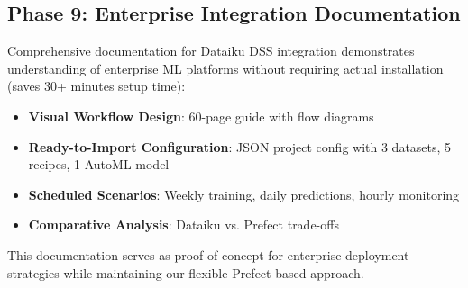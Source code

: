 \subsection{Phase 9: Enterprise Integration Documentation}

Comprehensive documentation for Dataiku DSS integration demonstrates understanding of enterprise ML platforms without requiring actual installation (saves 30+ minutes setup time):

\begin{itemize}
    \item \textbf{Visual Workflow Design}: 60-page guide with flow diagrams
    \item \textbf{Ready-to-Import Configuration}: JSON project config with 3 datasets, 5 recipes, 1 AutoML model
    \item \textbf{Scheduled Scenarios}: Weekly training, daily predictions, hourly monitoring
    \item \textbf{Comparative Analysis}: Dataiku vs. Prefect trade-offs
\end{itemize}

This documentation serves as proof-of-concept for enterprise deployment strategies while maintaining our flexible Prefect-based approach.

